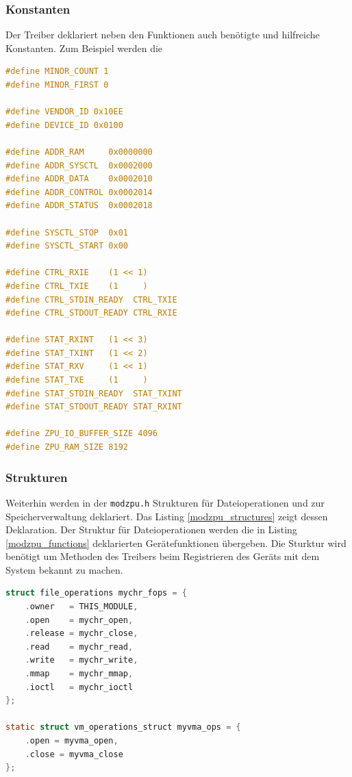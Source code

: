 \documentclass[11pt]{scrartcl}
\begin{document}
\subsubsection{Konstanten}
Der Treiber deklariert neben den Funktionen auch benötigte und hilfreiche Konstanten. Zum Beispiel werden die 
\begin{lstlisting}[language=C, firstnumber=13,label=modzpu_constants, caption=Verwendete Konstanten im Treibermodul]
#define MINOR_COUNT 1
#define MINOR_FIRST 0

#define VENDOR_ID 0x10EE
#define DEVICE_ID 0x0100

#define ADDR_RAM     0x0000000
#define ADDR_SYSCTL  0x0002000
#define ADDR_DATA    0x0002010
#define ADDR_CONTROL 0x0002014
#define ADDR_STATUS  0x0002018

#define SYSCTL_STOP  0x01
#define SYSCTL_START 0x00

#define CTRL_RXIE    (1 << 1)
#define CTRL_TXIE    (1     )
#define CTRL_STDIN_READY  CTRL_TXIE
#define CTRL_STDOUT_READY CTRL_RXIE

#define STAT_RXINT   (1 << 3)
#define STAT_TXINT   (1 << 2)
#define STAT_RXV     (1 << 1)
#define STAT_TXE     (1     )
#define STAT_STDIN_READY  STAT_TXINT
#define STAT_STDOUT_READY STAT_RXINT

#define ZPU_IO_BUFFER_SIZE 4096
#define ZPU_RAM_SIZE 8192
\end{lstlisting}


\subsubsection{Strukturen}
Weiterhin werden in der \texttt{modzpu.h} Strukturen für Dateioperationen und zur Speicherverwaltung deklariert. Das Listing \ref{modzpu_structures} zeigt dessen Deklaration. Der Struktur für Dateioperationen werden die in Listing \ref{modzpu_functions} deklarierten Gerätefunktionen übergeben. Die Sturktur wird benötigt um Methoden des Treibers beim Registrieren des Geräts mit dem System bekannt zu machen. 

\begin{lstlisting}[language=C, firstnumber=69, label=modzpu_structures,caption=modzpu Strukturen]
struct file_operations mychr_fops = {
	.owner   = THIS_MODULE,
	.open    = mychr_open,
	.release = mychr_close,
	.read    = mychr_read,
	.write   = mychr_write,
	.mmap    = mychr_mmap,
	.ioctl   = mychr_ioctl
};

static struct vm_operations_struct myvma_ops = {
	.open = myvma_open,
	.close = myvma_close
};

\end{lstlisting}
\end{document}
